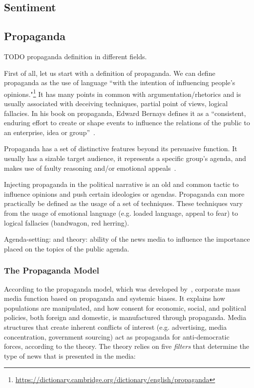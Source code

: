 \subsection{\statusred Sentiment}
\label{sec:lit_sentiment}


\subsection{\statusorange Propaganda}
\label{sec:lit_propaganda}
TODO propaganda definition in different fields.

First of all, let us start with a definition of propaganda.
We can define propaganda as the use of language ``with the intention of influencing people's opinions."\footnote{\url{https://dictionary.cambridge.org/dictionary/english/propaganda}}
It has many points in common with argumentation/rhetorics and is usually associated with deceiving techniques, partial point of views, logical fallacies.
In his book on propaganda, Edward Bernays defines it as a ``consistent, enduring effort to create or shape events to influence the relations of the public to an enterprise, idea or group''~\cite{bernays}.

Propaganda has a set of distinctive features beyond its persuasive function. It usually has a sizable target audience, it represents a specific group's agenda, and makes use of faulty reasoning and/or emotional appeals~\cite{miller1939techniques}.

Injecting propaganda in the political narrative is an old and common tactic to influence opinions and push certain ideologies or agendas.
Propaganda can more practically be defined as the usage of a set of techniques. These techniques vary from the usage of emotional language (e.g. loaded language, appeal to fear) to logical fallacies (bandwagon, red herring).

Agenda-setting: \cite{Cohen_1964} and \cite{mccombs1972agenda} theory: ability of the news media to influence the importance placed on the topics of the public agenda.

\subsubsection{The Propaganda Model}

According to the propaganda model, which was developed by~\citet{herman1988manufacturing}, corporate mass media function based on propaganda and systemic biases. It explains how populations are manipulated, and how consent for economic, social, and political policies, both foreign and domestic, is manufactured through propaganda. Media structures that create inherent conflicts of interest (e.g. advertising, media concentration, government sourcing) act as propaganda for anti-democratic forces, according to the theory.
The theory relies on five \emph{filters} that determine the type of news that is presented in the media:

